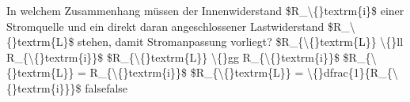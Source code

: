     {In welchem Zusammenhang müssen der Innenwiderstand \$R\_\textbackslash\{\}textrm\{i\}\$ einer Stromquelle und ein direkt daran angeschlossener Lastwiderstand \$R\_\textbackslash\{\}textrm\{L\}\$ stehen, damit Stromanpassung vorliegt?}
    {\$R\_\{\textbackslash\{\}textrm\{L\}\} \textbackslash\{\}ll R\_\{\textbackslash\{\}textrm\{i\}\}\$}
    {\$R\_\{\textbackslash\{\}textrm\{L\}\} \textbackslash\{\}gg R\_\{\textbackslash\{\}textrm\{i\}\}\$}
    {\$R\_\{\textbackslash\{\}textrm\{L\}\} = R\_\{\textbackslash\{\}textrm\{i\}\}\$}
    {\$R\_\{\textbackslash\{\}textrm\{L\}\} = \textbackslash\{\}dfrac\{1\}\{R\_\{\textbackslash\{\}textrm\{i\}\}\}\$}
    {false}{false}